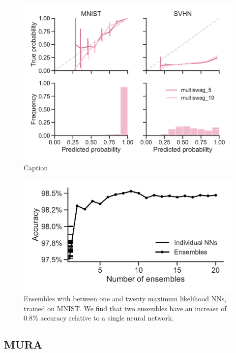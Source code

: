 \documentclass[10pt,a4paper,twocolumn]{article}
\begin{document}
\begin{figure}
    \centering
    \includegraphics[width=\linewidth]{figures/MnistMultiSwag.pdf}
    \caption{Caption}
    \label{fig:cross-calibration-multiswag}
\end{figure}

\begin{figure}
    \centering
    \includegraphics[width=\linewidth]{figures/ensemble_comparison.pdf}
    \caption{Ensembles with between one and twenty maximum likelihood NNs, trained on MNIST. We find that two ensembles have an increase of 0.8\% accuracy relative to a single neural network.}
    \label{fig:ensembles}
\end{figure}


\subsection{MURA}\label{ssec:mura}
\end{document}
